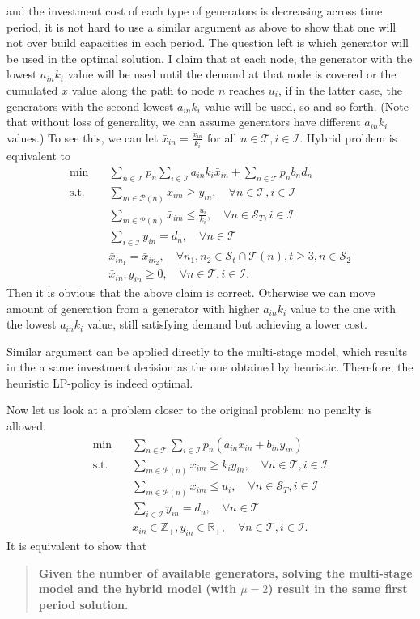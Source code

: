 \documentclass[10pt]{article}
\theoremstyle{plain}
\theoremstyle{definition}
\theoremstyle{remark}
\newcommand{\mcal}{\mathcal}
\newcommand{\subjectto}{\text{s.t.}}
\newcommand{\cP}{\mathcal{P}}
\newcommand{\T}{\mathcal{T}}
\newcommand{\Z}{\mathbb{Z}}
\newcommand{\R}{\mathbb{R}}
\begin{document}
and the investment cost of each type of generators is decreasing across time
period, it is not hard to use a similar argument as above to show that one
will not over build capacities in each period. The question left is which generator
will be used in the optimal solution. I claim that at each node, the generator
with the lowest $a_{in}k_i$ value will be used until the demand at that node is covered
or the cumulated $x$ value along the path to node $n$ reaches $u_i$,
if in the latter case, the generators with the second lowest $a_{in}k_i$ value will be used,
so and so forth. (Note that without loss of generality, we can assume generators have
different $a_{in}k_i$ values.)
To see this, we can let $\bar{x}_{in} = \frac{x_{in}}{k_i}$ for all $n\in \T, i\in \mcal{I}$.
Hybrid problem is equivalent to 
\begin{align*}
\min \quad & \sum_{n\in \T}p_n\sum_{i\in \mcal{I}}a_{in}k_i\bar{x}_{in} + \sum_{n\in \T}p_nb_{n}d_n\\
\subjectto \quad & \sum_{m\in \cP(n)}\bar{x}_{im} \ge y_{in},\quad \forall n\in \T, i\in \mcal{I}\\
& \sum_{m\in \cP(n)}\bar{x}_{im} \le \frac{u_i}{k_i}, \quad \forall n\in \mcal{S}_T, i\in \mcal{I}\\
& \sum_{i\in \mcal{I}}y_{in} = d_n, \quad \forall n\in \T\\
& \bar{x}_{in_1} = \bar{x}_{in_2}, \quad \forall n_1,n_2\in \mcal{S}_t\cap \T(n), t\ge 3, n\in \mcal{S}_2\\
& \bar{x}_{in}, y_{in}\ge 0, \quad \forall n\in \T, i\in \mcal{I}.
\end{align*}
Then it is obvious that the above claim is correct. Otherwise we can move amount of
generation from a generator with higher $a_{in}k_i$ value to the one with the lowest
$a_{in}k_i$ value, still satisfying demand but achieving a lower cost.

Similar argument can be applied directly to the multi-stage model, which results in the
a same investment decision as the one obtained by heuristic.
Therefore, the heuristic LP-policy is indeed optimal.

Now let us look at a problem closer to the original problem: no penalty is allowed.
\begin{align*}
\min \quad & \sum_{n\in \T}\sum_{i\in \mcal{I}}p_n(a_{in}x_{in} + b_{in}y_{in})\\
\subjectto \quad & \sum_{m\in \cP(n)}x_{im} \ge k_iy_{in},\quad \forall n\in \T, i\in \mcal{I}\\
& \sum_{m\in \cP(n)}x_{im} \le u_i, \quad \forall n\in \mcal{S}_T, i\in \mcal{I}\\
& \sum_{i\in \mcal{I}}y_{in} = d_n, \quad \forall n\in \T\\
& x_{in}\in \Z_+, y_{in}\in \R_+, \quad \forall n\in \T, i\in \mcal{I}.
\end{align*}
%
It is equivalent to show that
\begin{quote}\bf
Given the number of available generators,
solving the multi-stage model and the hybrid model (with $\mu=2$) result in the same
first period solution.
\end{quote}
\end{document}
